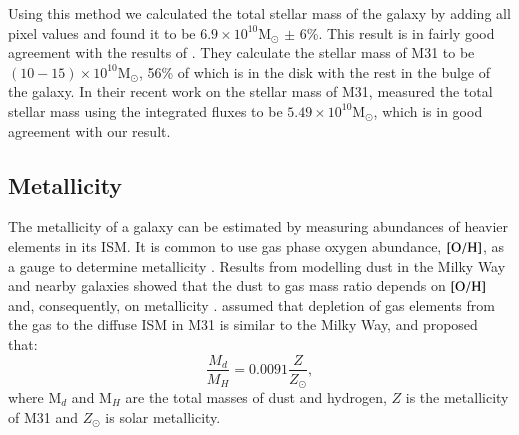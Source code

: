 Using this method we calculated the total stellar mass of the galaxy by adding all pixel values and found it to be $6.9 \times 10^{10}$M$_{\odot}$ $\pm$ 6\%. This result is in fairly good agreement with the results of \citet{Tamm12}. They calculate the stellar mass of M31 to be $(10-15) \times 10^{10}$M$_{\odot}$, 56\% of which is in the disk with the rest in the bulge of the galaxy. In their recent work on the stellar mass of M31, \cite{Viaene14} measured the total stellar mass using the integrated fluxes to be $5.49 \times 10^{10}$M$_{\odot}$, which is in good agreement with our result.



\subsection{Metallicity}
\label{sec:metal}
 
The metallicity of a galaxy can be estimated by measuring abundances of heavier elements in its ISM. 
It is common to use  gas phase oxygen abundance, $[{\rm O/H}]$, as a gauge to determine metallicity \citep[e.g.][]{McGaugh91, Zaritsky94}. 
Results from modelling dust in the Milky Way and nearby galaxies showed that the dust to gas mass ratio depends on $[{\rm O/H}]$ and, consequently, on metallicity \citet{Draine07}. \citet{Draine14} assumed that depletion of gas elements from the gas to the diffuse ISM in M31 is similar to the Milky Way, and proposed that: 
 \begin{equation}
 \label{equ: metal}
\frac{M_d}{M_H}=0.0091 \frac{Z}{Z_{\odot}},
 \end{equation} 
\noindent where M$_d$ and M$_H$ are the total masses of dust and hydrogen, $Z$ is the metallicity of M31 and $Z_{\odot}$ is solar metallicity. 

